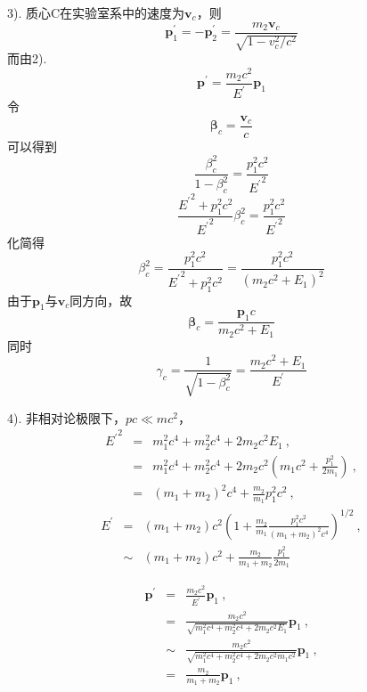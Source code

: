 \documentclass[11pt,a4paper]{article}
\renewcommand{\vec}[1]{\boldsymbol{#1}}
\begin{document}
3). 质心C在实验室系中的速度为$\vec{v}_c$，则
\begin{equation*}
\vec{p}^{\prime}_1 = -\vec{p}^{\prime}_2 = \frac{m_2 \vec{v}_c}{\sqrt{1- v_c^2/c^2}}
\end{equation*}
而由2).
\begin{equation*}
\vec{p}^{\prime} = \frac{m_2 c^2}{E^{\prime}} \vec{p}_1
\end{equation*}
令
\begin{equation*}
\vec{\beta}_c = \frac{\vec{v}_c}{c}
\end{equation*}
可以得到
\begin{equation*}
\frac{\beta_c^2}{1-\beta_c^2} = \frac{p^2_1 c^2}{{E^{\prime}}^2}
\end{equation*}
\begin{equation*}
\frac{{E^{\prime}}^2 +p_1^2 c^2}{{E^{\prime}}^2} \beta_c^2 = \frac{p_1^2 c^2}{{E^{\prime}}^2}
\end{equation*}
化简得
\begin{equation*}
\beta_c^2 = \frac{p_1^2 c^2}{{E^{\prime}}^2 +p_1^2 c^2} = \frac{p_1^2 c^2}{(m_2 c^2 +E_1)^2}
\end{equation*}
由于$\vec{p}_1$与$\vec{v}_c$同方向，故
\begin{equation*}
\vec{\beta}_c =  \frac{\vec{p}_1 c}{m_2 c^2 +E_1}
\end{equation*}
同时
\begin{equation*}
\gamma_c = \frac{1}{\sqrt{1 -\beta^2_c}} = \frac{m_2 c^2 +E_1}{E^{\prime}}
\end{equation*}

4). 非相对论极限下，$pc \ll mc^2$，
\begin{eqnarray*}
\nonumber {E^{\prime}}^2 &=& m_1^2 c^4 + m_2^2 c^4 +2m_2 c^2 E_1 ~, \\
&=& m_1^2 c^4 + m_2^2 c^4 +2m_2 c^2 (m_1 c^2 +\frac{p_1^2}{2m_1}) ~, \\
&=& (m_1+ m_2)^2 c^4 +\frac{m_2}{m_1}  p_1^2 c^2 ~,
\end{eqnarray*}
\begin{eqnarray*}
\nonumber E^{\prime} &=& (m_1+ m_2) c^2 \left(1 + \frac{m_2}{m_1}  \frac{p_1^2 c^2}{(m_1+ m_2)^2 c^4}\right)^{1/2} ~, \\
\nonumber &\sim& (m_1+ m_2) c^2 + \frac{m_2}{m_1+ m_2} \frac{p_1^2}{2m_1}
\end{eqnarray*}


\begin{eqnarray*}
\nonumber \vec{p}^{\prime} &=& \frac{m_2 c^2}{E^{\prime}} \vec{p}_1 ~, \\
\nonumber &=& \frac{m_2 c^2}{\sqrt{m_1^2 c^4 + m_2^2 c^4 +2m_2 c^2 E_1}} \vec{p}_1 ~, \\
\nonumber  &\sim& \frac{m_2 c^2}{\sqrt{m_1^2 c^4 + m_2^2 c^4 +2m_2 c^2 m_1 c^2}} \vec{p}_1 ~, \\
&=& \frac{m_2}{m_1 + m_2} \vec{p}_1 ~,
\end{eqnarray*}
\end{document}
